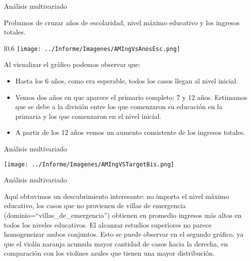 \documentclass[pdf]{beamer}
\begin{document}
\begin{frame}{Análisis multivariado}
    \footnotesize

    Probamos de cruzar años de escolaridad, nivel máximo educativo y los ingresos totales.

    \begin{wrapfigure}{l}{0.6\textwidth}
        \texttt{[image: ../Informe/Imagenes/AMIngVsAnosEsc.png]}
    \end{wrapfigure}

    Al visualizar el gráfico podemos observar que:

    \begin{itemize}
        \item Hasta los 6 años, como era esperable, todos los casos llegan al nivel inicial.
        \item Vemos dos años en que aparece el primario completo: 7 y 12 años. Estimamos que se debe a la división entre los que comenzaron su educación en la primaria y los que comenzaron en el nivel inicial.
        \item A partir de los 12 años vemos un aumento consistente de los ingresos totales.
    \end{itemize}

\end{frame} 

\begin{frame}{Análisis multivariado}

    \begin{center}
        \texttt{[image: ../Informe/Imagenes/AMIngVSTargetBis.png]}
    \end{center}

\end{frame}

\begin{frame}{Análisis multivariado}

    Aquí obtuvimos un descubrimiento interesante: no importa el nivel máximo educativo, los casos que no provienen de villas de emergencia (dominio=``villas\_de\_emergencia'') obtienen en promedio ingresos más altos en todos los niveles educativos. El alcanzar estudios superiores no parece homogeneizar ambos conjuntos. Esto se puede observar en el segundo gráfico, ya que el violín naranja acumula mayor cantidad de casos hacia la derecha, en comparación con los violines azules que tienen una mayor distribución.

\end{frame}
    
\end{document}

